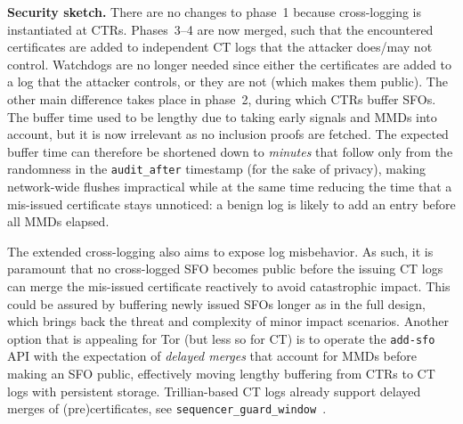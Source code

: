 \textbf{Security sketch.} 
There are no changes to phase~1 because cross-logging is instantiated at CTRs.
Phases~3--4 are now merged, such that the encountered certificates are added to
independent CT logs that the attacker does/may not control.  Watchdogs are no
longer needed since either the certificates are added to a log that the attacker
controls, or they are not (which makes them public).  The other main difference takes place in phase~2,
during which CTRs buffer SFOs.  The buffer time used to be lengthy due to taking
early signals and MMDs into account, but it is now irrelevant as no inclusion
proofs are fetched.  The expected buffer time can therefore be shortened down
to \emph{minutes} that follow only from the randomness in the
\texttt{audit\_after} timestamp (for the sake of privacy), making network-wide
flushes impractical while at the same time reducing the time that a mis-issued
certificate stays unnoticed:
	a benign log is likely to add an entry before all MMDs elapsed.

The extended cross-logging also aims to expose log misbehavior.  As such, it is
paramount that no cross-logged SFO becomes public before the issuing CT logs can
merge the mis-issued certificate reactively to avoid catastrophic impact. This
could be assured by buffering newly issued SFOs longer as in the full design,
which brings back the threat and complexity of minor impact scenarios. Another
option that is appealing for Tor (but less so for CT) is to operate the
\texttt{add-sfo} API with the expectation of \emph{delayed merges} that account
for MMDs before making an SFO public, effectively moving lengthy buffering from
CTRs to CT logs with persistent storage.  Trillian-based CT logs already support
delayed merges of (pre)certificates, see
\texttt{sequencer\_guard\_window}~\cite{delayed-merge}.
